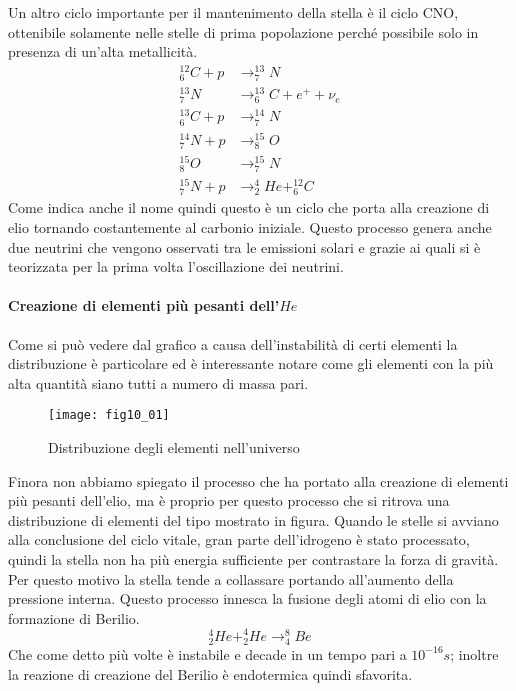 Un altro ciclo importante per il mantenimento della stella è il ciclo CNO, ottenibile solamente nelle stelle di prima popolazione perché possibile solo in presenza di un'alta metallicità.
\begin{equation}
\begin{split}
^{12}_{6}C+p &\longrightarrow ^{13}_7N\\
^{13}_7N &\longrightarrow ^{13}_{6}C+e^++\nu_e\\
^{13}_{6}C+p &\longrightarrow ^{14}_7N\\
^{14}_7N +p &\longrightarrow ^{15}_8O\\
^{15}_8O &\longrightarrow ^{15}_7N\\
^{15}_7N+p &\longrightarrow ^4_2He +^{12}_{6}C
\end{split}
\end{equation}
Come indica anche il nome quindi questo è un ciclo che porta alla creazione di elio tornando costantemente al carbonio iniziale.
Questo processo genera anche due neutrini che vengono osservati tra le emissioni solari e grazie ai quali si è teorizzata per la prima volta l'oscillazione dei neutrini.

\paragraph{Creazione di elementi più pesanti dell'$He$}

Come si può vedere dal grafico a causa dell'instabilità di certi elementi la distribuzione è particolare ed è interessante notare come gli elementi con la più alta quantità siano tutti a numero di massa pari.
\begin{figure}[h]
\centering
\texttt{[image: fig10\_01]}
\caption{Distribuzione degli elementi nell'universo}
\end{figure}

Finora non abbiamo spiegato il processo che ha portato alla creazione di elementi più pesanti dell'elio, ma è proprio per questo processo che si ritrova una distribuzione di elementi del tipo mostrato in figura.
Quando le stelle si avviano alla conclusione del ciclo vitale, gran parte dell'idrogeno è stato processato, quindi la stella non ha più energia sufficiente per contrastare la forza di gravità.
Per questo motivo la stella tende a collassare portando all'aumento della pressione interna.
Questo processo innesca la fusione degli atomi di elio con la formazione di Berilio.
\begin{equation}
^4_2He+^4_2He\longrightarrow ^8_4Be
\end{equation}
Che come detto più volte è instabile e decade in un tempo pari a $10^{-16}s$; inoltre la reazione di creazione del Berilio è endotermica quindi sfavorita.

